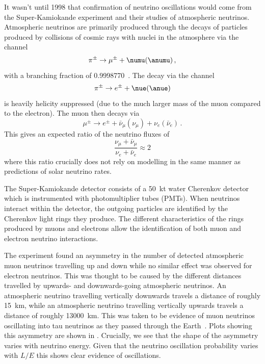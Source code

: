 It wasn't until 1998 that confirmation of neutrino oscillations would come from the Super-Kamiokande experiment and their studies of atmospheric neutrinos.
Atmospheric neutrinos are primarily produced through the decays of particles produced by collisions of cosmic rays with nuclei in the atmosphere via the channel
\begin{equation}
  \pi^{\pm} \rightarrow \mu^{\pm} + \numu(\anumu) \, ,
\end{equation}
with a branching fraction of \num{0.9998770}~\cite{pdg2018}.
The decay via the channel
\begin{equation}
	\pi^{\pm} \rightarrow e^{\pm} + \nue(\anue) 
\end{equation}
is heavily helicity suppressed (due to the much larger mass of the muon compared to the electron).
The muon then decays via
\begin{equation}
  \mu^{\pm} \rightarrow e^{\pm} + \bar{\nu}_{\mu}(\nu_{\mu}) + \nu_{e}(\bar{\nu}_{e}) \, .
\end{equation}
This gives an expected ratio of the neutrino fluxes of
\begin{equation}
  \frac{\nu_{\mu} + \bar{\nu}_{\mu}}{\nu_{e} + \bar{\nu}_{e}} \approx 2
\end{equation}
where this ratio crucially does not rely on modelling in the same manner as predictions of solar neutrino rates.

The Super-Kamiokande detector consists of a \SI{50}{\kilo\tonne} water Cherenkov detector which is instrumented with photomultiplier tubes (PMTs).
When neutrinos interact within the detector, the outgoing particles are identified by the Cherenkov light rings they produce.
The different characteristics of the rings produced by muons and electrons allow the identification of both muon and electron neutrino interactions.

The experiment found an asymmetry in the number of detected atmospheric muon neutrinos travelling up and down while no similar effect was observed for electron neutrinos.
This was thought to be caused by the different distances travelled by upwards- and downwards-going atmospheric neutrinos.
An atmospheric neutrino travelling vertically downwards travels a distance of roughly \SI{15}{\km}, while an atmospheric neutrino travelling vertically upwards travels a distance of roughly \SI{13000}{\km}.
This was taken to be evidence of muon neutrinos oscillating into tau neutrinos as they passed through the Earth~\cite{superK}.
Plots showing this asymmetry are shown in .
Crucially, we see that the shape of the asymmetry varies with neutrino energy. 
Given that the neutrino oscillation probability varies with $L/E$ this shows clear evidence of oscillations.

